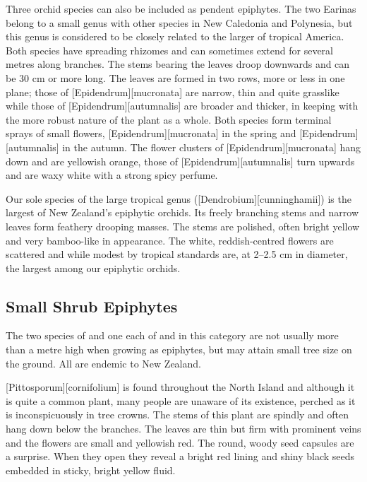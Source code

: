 Three orchid species can also be included as pendent epiphytes.
The two Earinas belong to a small genus with other species in New Caledonia and Polynesia, but this genus is considered to be closely related to the larger  of tropical America.
Both species have spreading rhizomes and can sometimes extend for several metres along branches.
The stems bearing the leaves droop downwards and can be 30 cm or more long.
The leaves are formed in two rows, more or less in one plane; those of [Epidendrum][mucronata] are narrow, thin and quite grasslike while those of [Epidendrum][autumnalis] are broader and thicker, in keeping with the more robust nature of the plant as a whole.
Both species form terminal sprays of small flowers, [Epidendrum][mucronata] in the spring and [Epidendrum][autumnalis] in the autumn.
The flower clusters of [Epidendrum][mucronata] hang down and are yellowish orange, those of [Epidendrum][autumnalis] turn upwards and are waxy white with a strong spicy perfume.

Our sole species of the large tropical genus  ([Dendrobium][cunninghamii]) is the largest of New Zealand's epiphytic orchids.
Its freely branching stems and narrow leaves form feathery drooping masses.
The stems are polished, often bright yellow and very bamboo-like in appearance.
The white, reddish-centred flowers are scattered and while modest by tropical standards are, at 2--2.5 cm in diameter, the largest among our epiphytic orchids.

\subsection{Small Shrub Epiphytes}

The two species of  and one each of  and  in this category are not usually more than a metre high when growing as epiphytes, but may attain small tree size on the ground.
All are endemic to New Zealand.

[Pittosporum][cornifolium] is found throughout the North Island and although it is quite a common plant, many people are unaware of its existence, perched as it is inconspicuously in tree crowns.
The stems of this plant are spindly and often hang down below the branches.
The leaves are thin but firm with prominent veins and the flowers are small and yellowish red.
The round, woody seed capsules are a surprise.
When they open they reveal a bright red lining and shiny black seeds embedded in sticky, bright yellow fluid.


